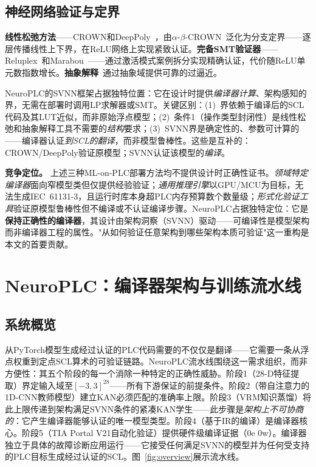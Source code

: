 \documentclass[journal,onecolumn]{IEEEtran}
\newcommand{\neuroplc}{NeuroPLC\xspace}
\theoremstyle{definition}
\theoremstyle{plain}
\theoremstyle{remark}
\begin{document}
\subsection{神经网络验证与定界}
\label{sec:nn-verification}

\textbf{线性松弛方法}——CROWN和DeepPoly~\cite{zhang2018crown,singh2019abstract}，由$\alpha$-$\beta$-CROWN~\cite{wang2021beta}泛化为分支定界——逐层传播线性上下界，在ReLU网络上实现紧致认证。\textbf{完备SMT验证器}——Reluplex~\cite{katz2017reluplex}和Marabou~\cite{katz2019marabou}——通过激活模式案例拆分实现精确认证，代价随ReLU单元数指数增长。\textbf{抽象解释}~\cite{mirman2018differentiable,gowal2018scalable}通过抽象域提供可靠的过逼近。

\neuroplc{}的SVNN框架占据独特位置：它在设计时提供\textit{编译器计算}、架构感知的界，无需在部署时调用LP求解器或SMT。关键区别：(1)~界依赖于编译后的SCL代码及其LUT近似，而非原始浮点模型；(2)~条件1（操作类型封闭性）是线性松弛和抽象解释工具不需要的\textit{结构}要求；(3)~SVNN界是确定性的、参数可计算的——编译器认证\textit{到SCL的翻译}，而非模型鲁棒性。这些是互补的：CROWN/DeepPoly验证原模型；SVNN认证该模型的\textit{编译}。

\vspace{4pt}
\noindent\textbf{竞争定位。}
上述三种ML-on-PLC部署方法均不提供设计时正确性证书。\textit{领域特定编译器}面向窄模型类但仅提供经验验证；\textit{通用推理引擎}以GPU/MCU为目标，无法生成IEC~61131-3，且运行时库本身超PLC内存预算数个数量级；\textit{形式化验证工具}验证原模型鲁棒性但不编译或不认证编译步骤。\neuroplc{}占据独特定位：它是\textbf{保持正确性的编译器}，其设计由架构洞察（SVNN）驱动——可编译性是模型架构而非编译器工程的属性。"从如何验证任意架构到哪些架构本质可验证"这一重构是本文的首要贡献。



\section{NeuroPLC：编译器架构与训练流水线}
\label{sec:method}

\subsection{系统概览}

从PyTorch模型生成经过认证的PLC代码需要的不仅仅是翻译——它需要一条从浮点权重到定点SCL算术的可验证链路。\neuroplc{}流水线围绕这一需求组织，而非方便性：其五个阶段的每一个消除一种特定的正确性威胁。阶段1（28-D特征提取）界定输入域至$[-3,3]^{28}$——所有下游保证的前提条件。阶段2（带自注意力的1D-CNN教师模型）建立KAN必须匹配的准确率上限。阶段3（VRM知识蒸馏）将此上限传递到架构满足SVNN条件的紧凑KAN学生——此步骤是\textit{架构上不可协商的}：它产生编译器能够认证的唯一模型类型。阶段4（基于IR的编译）是编译器核心。阶段5（TIA Portal V21自动化验证）提供硬件级编译证据（0e 0w）。编译器独立于具体的故障诊断应用运行——它接受任何满足SVNN的模型并为任何受支持的PLC目标生成经过认证的SCL。图~\ref{fig:overview}展示流水线。
\end{document}
